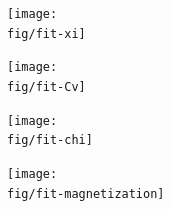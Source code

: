 \documentclass[12pt,a4paper]{article}
\newcommand{\fig}{../fig}
\begin{document}
	\begin{figure}[htb!]
		\centering
		\begin{subfigure}{0.45\linewidth}
			\centering
			\texttt{[image: \\fig/fit-xi]}
		\end{subfigure}
		\begin{subfigure}{0.45\linewidth}
			\centering
			\texttt{[image: \\fig/fit-Cv]}
		\end{subfigure}
	\end{figure}
	\begin{figure}[htb!]
		\centering
		\begin{subfigure}{0.45\linewidth}
			\centering
			\texttt{[image: \\fig/fit-chi]}
		\end{subfigure}
		\begin{subfigure}{0.45\linewidth}
			\centering
			\texttt{[image: \\fig/fit-magnetization]}
		\end{subfigure}
	\end{figure}
\end{document}
